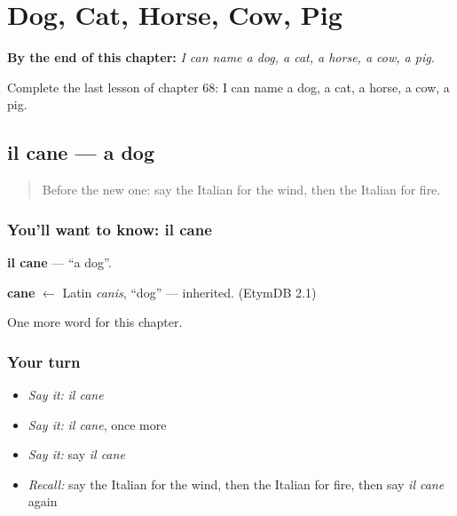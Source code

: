 
\chapter{Dog, Cat, Horse, Cow, Pig}
\label{ch:it-dog-cat-horse-cow-pig}

\begin{chapteropening}
\textbf{By the end of this chapter:} \emph{I can name a dog, a cat, a horse, a cow, a pig.}

Complete the last lesson of chapter 68: I can name a dog, a cat, a horse, a cow, a pig.
\end{chapteropening}

\section[il cane]{il cane — a dog}

\label{lesson:IT-C68-cane}



\begin{quote}
Before the new one: say the Italian for the wind, then the Italian for fire.
\end{quote}

\subsection*{You'll want to know: il cane}
\textbf{il cane} — \textquotedblleft{}a dog\textquotedblright{}.

\begin{cousinweb}
\textbf{cane} $\leftarrow$ Latin \emph{canis}, \textquotedblleft{}dog\textquotedblright{} — inherited. (EtymDB 2.1)
\end{cousinweb}

\begin{grammarlens}[title={What you've built}]
One more word for this chapter.
\end{grammarlens}

\subsection*{Your turn}
\begin{itemize}
\raggedright
  \item \emph{Say it:} \emph{il cane}
  \item \emph{Say it:} \emph{il cane}, once more
  \item \emph{Say it:} say \emph{il cane}
  \item \emph{Recall:} say the Italian for the wind, then the Italian for fire, then say \emph{il cane} again
\end{itemize}


